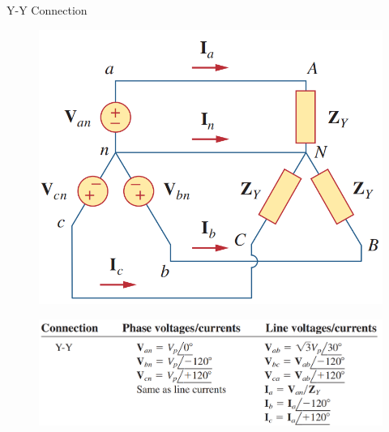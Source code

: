 \documentclass{beamer}
\begin{document}
\begin{frame}{Y-Y Connection}
    \begin{figure}[H]
        \centering
        \includegraphics[scale = 0.4]{C12/yy.png}
        \label{fig:enter-label}
    \end{figure}
    \begin{figure}[H]
        \centering
        \includegraphics[scale = 0.3]{C12/yy1.png}
        \label{fig:enter-label}
    \end{figure}
\end{frame}
\end{document}
